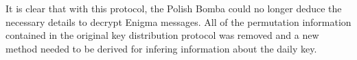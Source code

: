 It is clear that with this protocol, the Polish Bomba could no longer deduce the necessary 
details to decrypt Enigma messages. All of the permutation information contained in the original key distribution 
protocol was removed and a new method needed to be derived for infering information about the daily key.


    
    
    
